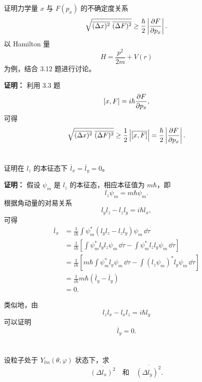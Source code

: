 \documentclass[12pt,a4paper]{article}
\begin{document}
\section{}
证明力学量 \(x\) 与 \(F(p_{x})\) 的不确定度关系
\[
\sqrt{\overline{(\Delta x)^{2}}\ \overline{(\Delta F)^{2}}}
\ge
\frac{\hbar}{2}\left|\pdv{F}{p_{x}}\right|.
\]
以 Hamilton 量
\[
H=\frac{p^{2}}{2m}+V(r)
\]
为例，结合 3.12 题进行讨论。

\vspace{0.5cm}

\noindent\textbf{证明：}
利用 3.3 题
\[
[x,F]=i\hbar \pdv{F}{p_{x}},
\]
可得
\[
\sqrt{\overline{(\Delta x)^{2}}\ \overline{(\Delta F)^{2}}}
\ge
\frac{1}{2}\left|\overline{\left[x,F\right]}\right|
=
\frac{\hbar}{2}\left|\pdv{F}{p_{x}}\right|.
\]

\section{}
证明在 \(l_{z}\) 的本征态下 \(\overline{l}_{x}=\overline{l}_{y}=0\)。

\vspace{0.5cm}

\noindent\textbf{证明：}
假设 \(\psi_{m}\) 是 \(l_{z}\) 的本征态，相应本征值为 \(m\hbar\)，即
\[
l_{z}\psi_{m}=m\hbar \psi_{m}.
\]
根据角动量的对易关系
\[
l_{y}l_{z}-l_{z}l_{y}=i\hbar l_{x},
\]
可得
\begin{align*}
\overline{l}_{x}
&=
\frac{1}{i\hbar}\int \psi_{m}^{*}(l_{y}l_{z}-l_{z}l_{y})\psi_{m}\,\dd\tau\\
&=\frac{1}{i\hbar}
\left[\int \psi_{m}^{*}l_{y}l_{z}\psi_{m}\,\dd\tau
-
\int \psi_{m}^{*}l_{z}l_{y}\psi_{m}\,\dd\tau\right]\\ 
&=\frac{1}{i\hbar}
\left[
m\hbar \int \psi_{m}^{*}l_{y}\psi_{m}\,\dd\tau
-
\int (l_{z}\psi_{m})^{*}l_{y}\psi_{m}\,\dd\tau
\right]\\
&=
\frac{1}{i\hbar}m\hbar (\overline{l}_{y}-\overline{l}_{y})\\
&=
0.
\end{align*}

类似地，由
\[
l_{z}l_{x}-l_{x}l_{z}=i\hbar l_{y}
\]
可以证明
\[
\overline{l}_{y}=0.
\]

\section{}
设粒子处于 \(Y_{lm}(\theta,\varphi)\) 状态下，求
\[
\overline{(\Delta l_{x})^{2}}
\quad \text{和} \quad
\overline{(\Delta l_{y})^{2}}.
\]
\end{document}
